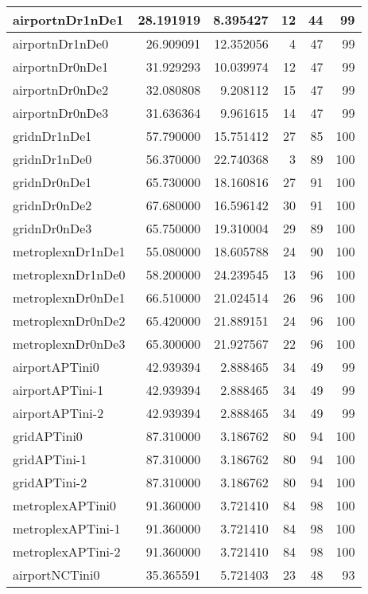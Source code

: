 \documentclass[../../../thesis.tex]{subfiles}
\begin{document}
\begin{longtable}{|l|r|r|r|r|r|}
\endlastfoot
airportnDr1nDe1 & 28.191919 & 8.395427 & 12 & 44 & 99 \\ \hline
airportnDr1nDe0 & 26.909091 & 12.352056 & 4 & 47 & 99 \\ \hline
airportnDr0nDe1 & 31.929293 & 10.039974 & 12 & 47 & 99 \\ \hline
airportnDr0nDe2 & 32.080808 & 9.208112 & 15 & 47 & 99 \\ \hline
airportnDr0nDe3 & 31.636364 & 9.961615 & 14 & 47 & 99 \\ \hline
gridnDr1nDe1 & 57.790000 & 15.751412 & 27 & 85 & 100 \\ \hline
gridnDr1nDe0 & 56.370000 & 22.740368 & 3 & 89 & 100 \\ \hline
gridnDr0nDe1 & 65.730000 & 18.160816 & 27 & 91 & 100 \\ \hline
gridnDr0nDe2 & 67.680000 & 16.596142 & 30 & 91 & 100 \\ \hline
gridnDr0nDe3 & 65.750000 & 19.310004 & 29 & 89 & 100 \\ \hline
metroplexnDr1nDe1 & 55.080000 & 18.605788 & 24 & 90 & 100 \\ \hline
metroplexnDr1nDe0 & 58.200000 & 24.239545 & 13 & 96 & 100 \\ \hline
metroplexnDr0nDe1 & 66.510000 & 21.024514 & 26 & 96 & 100 \\ \hline
metroplexnDr0nDe2 & 65.420000 & 21.889151 & 24 & 96 & 100 \\ \hline
metroplexnDr0nDe3 & 65.300000 & 21.927567 & 22 & 96 & 100 \\ \hline
airportAPTini0 & 42.939394 & 2.888465 & 34 & 49 & 99 \\ \hline
airportAPTini-1 & 42.939394 & 2.888465 & 34 & 49 & 99 \\ \hline
airportAPTini-2 & 42.939394 & 2.888465 & 34 & 49 & 99 \\ \hline
gridAPTini0 & 87.310000 & 3.186762 & 80 & 94 & 100 \\ \hline
gridAPTini-1 & 87.310000 & 3.186762 & 80 & 94 & 100 \\ \hline
gridAPTini-2 & 87.310000 & 3.186762 & 80 & 94 & 100 \\ \hline
metroplexAPTini0 & 91.360000 & 3.721410 & 84 & 98 & 100 \\ \hline
metroplexAPTini-1 & 91.360000 & 3.721410 & 84 & 98 & 100 \\ \hline
metroplexAPTini-2 & 91.360000 & 3.721410 & 84 & 98 & 100 \\ \hline
airportNCTini0 & 35.365591 & 5.721403 & 23 & 48 & 93 \\ \hline

\end{longtable}
\end{document}
